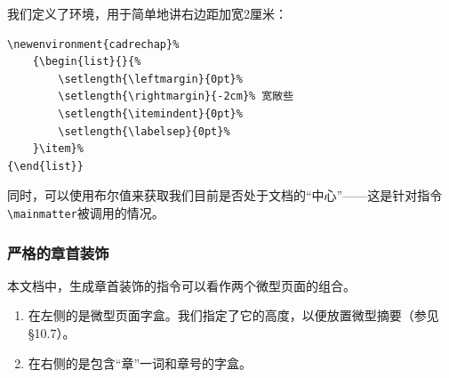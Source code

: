我们定义了环境，用于简单地讲右边距加宽2厘米：

\begin{dmd}
\begin{verbatim}
\newenvironment{cadrechap}% 
    {\begin{list}{}{%
        \setlength{\leftmargin}{0pt}% 
        \setlength{\rightmargin}{-2cm}% 宽敞些
        \setlength{\itemindent}{0pt}% 
        \setlength{\labelsep}{0pt}%
    }\item}% 
{\end{list}}
\end{verbatim}
\end{dmd}

同时，可以使用布尔值来获取我们目前是否处于文档的“中心”——这是针对指令\verb|\mainmatter|被调用的情况。

\subsubsection{严格的章首装饰}

本文档中，生成章首装饰的指令可以看作两个微型页面的组合。%

\begin{enumerate}
    \item 在左侧的是微型页面字盒。我们指定了它的高度，以便放置微型摘要（参见\S 10.7）。
    \item 在右侧的是包含“章”一词和章号的字盒。
\end{enumerate}

\newcommand{\boite}[1]{%
  {\setlength{\fboxrule}{.2pt}%
    \setlength{\fboxsep}{-\fboxrule}%
    \fbox{#1}}}

\newcommand{\fairechapitre}[1]{%
  \noindent\begin{minipage}{\linewidth}%
      \boite{\begin{minipage}[t][3cm][c]{.75\textwidth}%
          \centering%
          为\\微型摘要\\准备的\\微型页面
        \end{minipage}}%
      \boite{\begin{minipage}[t]{.25\textwidth}
          \begin{flushright}
            {\fnomfont\chaptername}\\[.5cm]
            {\fnumfont\thechapter}
          \end{flushright}
        \end{minipage}}
    \end{minipage}\par
  \begin{flushright}\ftitrefont#1\end{flushright}}

